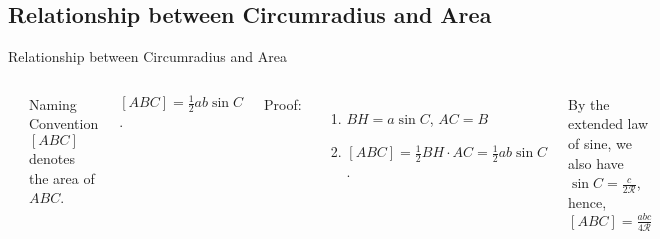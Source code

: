 \documentclass{beamer}
\begin{document}
\subsection{Relationship between Circumradius and Area}
\begin{frame}{Relationship between Circumradius and Area}
	\begin{columns}
		\begin{center}
			\begin{minipage}{0.9\textwidth}
			\end{minipage}
		\end{center}
		\begin{minipage}{0.9\textwidth}
			\begin{exampleblock}{Naming Convention}
				$[ABC]$	denotes the area of $ABC$.
			\end{exampleblock}
			\begin{theorem}
				$[ABC] = \frac{1}{2}ab\sin C$.
			\end{theorem}
			Proof:
			\begin{enumerate}
				\item $BH = a\sin C$, $AC=B$
				\item $[ABC] = \frac{1}{2} BH \cdot AC = \frac{1}{2}ab\sin C$.
			\end{enumerate}
			\begin{theorem}
				By the extended law of sine, we also have $\sin C = \frac{c}{2\mathcal{R}}$, hence, $[ABC] = \frac{abc}{4\mathcal{R}}$
			\end{theorem}
		\end{minipage}
	\end{columns}
\end{frame}
\end{document}
